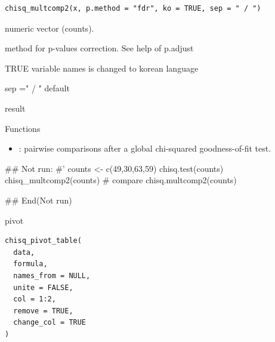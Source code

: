 \documentclass[a4paper]{book}
\begin{document}
%
\begin{Usage}
\begin{verbatim}
chisq_multcomp2(x, p.method = "fdr", ko = TRUE, sep = " / ")
\end{verbatim}
\end{Usage}
%
\begin{Arguments}
\begin{ldescription}
\item[\code{x}] numeric vector (counts).

\item[\code{p.method}] method for p-values correction. See help of p.adjust

\item[\code{ko}] TRUE variable names is changed to korean language

\item[\code{sep}] sep =" / " default
\end{ldescription}
\end{Arguments}
%
\begin{Value}
result
\end{Value}
%
\begin{Section}{Functions}
\begin{itemize}

\item{} : pairwise comparisons after a global chi-squared goodness-of-fit test.


\end{itemize}
\end{Section}
%
\begin{Examples}
\begin{ExampleCode}
## Not run: 
#'
counts <- c(49,30,63,59)
chisq.test(counts)
chisq_multcomp2(counts)
# compare
chisq.multcomp2(counts)


## End(Not run)
\end{ExampleCode}
\end{Examples}
%
\begin{Description}
pivot
\end{Description}
%
\begin{Usage}
\begin{verbatim}
chisq_pivot_table(
  data,
  formula,
  names_from = NULL,
  unite = FALSE,
  col = 1:2,
  remove = TRUE,
  change_col = TRUE
)
\end{verbatim}
\end{Usage}
%
\end{document}
